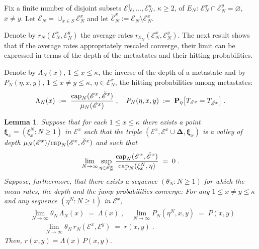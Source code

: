 \documentclass[reqno]{amsart}
\newtheorem{lemma}[theorem]{Lemma}
\begin{document}
Fix a finite number of disjoint subsets ${{\mathscr E}}^1_N, \dots, {{\mathscr E}}^\kappa_N$, $\kappa\ge 2$, of $E_N$: ${{\mathscr E}}^x_N\cap {{\mathscr E}}^y_N=\varnothing$, $x\neq y$. Let ${{\mathscr E}}_N=\cup_{x\in S}{{\mathscr E}}^x_N$
and let $\breve{{{\mathscr E}}}^x_N := {{\mathscr E}}_N\setminus {{\mathscr E}}^x_N$. 

Denote by $r_N({{\mathscr E}}^x_N,{{\mathscr E}}^y_N)$ the average rates $r_{{{\mathscr E}}_N}({{\mathscr E}}^x_N,{{\mathscr E}}^y_N)$. The next result shows that if the
average rates appropriately rescaled converge, their limit can be
expressed in terms of the depth of the metastates and their hitting
probabilities.

Denote by $\Lambda_N (x)$, $1\le x\le \kappa$, the inverse of the
depth of a metastate and by $P_N(\eta,x,y)$, $1\le x\not = y\le
\kappa$, $\eta\in {{\mathscr E}}^x_N$, the hitting probabilities among
metastates:
\begin{equation*}
\Lambda_N(x) \;:=\; \frac{{{\rm cap}}_N({{\mathscr E}}^x , \breve{{{\mathscr E}}}^{x})}
{\mu_N({{\mathscr E}}^{x})}\;, \quad P_N(\eta,x,y) \;:=\; 
{{\mathbf P}}_\eta \big[ T_{{{\mathscr E}}^{y}} = T_{\breve{{{\mathscr E}}}^{x}} \big]\;.
\end{equation*}

\begin{lemma}
\label{s39}
Suppose that for each $1\le x\le \kappa$ there exists a point ${{\boldsymbol \xi}}_x = (\xi^N_x : N\ge 1)$ in ${{\mathscr E}}^x$ such that the triple $({{\mathscr E}}^x, {{\mathscr E}}^x \cup {{\boldsymbol \Delta}}, {{\boldsymbol \xi}}_x)$ is a valley of depth
$\mu_N({{\mathscr E}}^{x})/{{\rm cap}}_N({{\mathscr E}}^x , \breve{{{\mathscr E}}}^{x})$ and such that
\begin{equation*}
\lim_{N\to\infty} \sup_{\eta \in {{\mathscr E}}^{x}_N} 
\frac{{{\rm cap}}_N({{\mathscr E}}^{x} , \breve{{{\mathscr E}}}^{x})}
{{{\rm cap}}_N(\xi^N_x, \eta)} \;=\; 0\; .
\end{equation*}
Suppose, furthermore, that there exists a sequence $(\theta_N : N\ge
1)$ for which the mean rates, the depth and the jump probabilities
converge: For any $1\le x\not = y \le \kappa$ and any sequence
$(\eta^N : N\ge 1)$ in ${{\mathscr E}}^x$,
\begin{equation*}
\begin{split}
& \lim_{N\to\infty} \theta_N \, \Lambda_N(x) \;=\; \Lambda(x)\; , \quad
\lim_{N\to\infty} P_N(\eta^N,x,y) \;=\; P(x,y)\; \\
& \qquad \lim_{N\to\infty} \theta_N \, r_N({{\mathscr E}}^x, {{\mathscr E}}^y) 
\;=\; r(x,y)\;.
\end{split}
\end{equation*}
Then, $r(x,y) = \Lambda(x) \, P(x,y)$.
\end{lemma}
\end{document}
